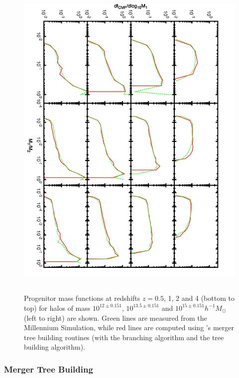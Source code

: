 \begin{figure}
 \begin{center}
 \includegraphics[height=160mm,angle=90]{../plots/progenitorMassFunction.pdf}
 \end{center}
 \caption{Progenitor mass functions at redshifts $z=0.5$, 1, 2 and 4 (bottom to top) for halos of mass $10^{12\pm0.151}$, $10^{13.5\pm0.151}$ and $10^{15\pm0.151}h^{-1}M_\odot$ (left to right) are shown. Green lines are measured from the Millennium Simulation, while red lines are computed using \glc's merger tree building routines (with the \cite{parkinson_generating_2008} branching algorithm and the \cite{cole_hierarchical_2000} tree building algorithm).}
 \label{fig:PCH_Progenitor_MFs}
\end{figure}

\subsubsection{Merger Tree Building}\label{sec:MergerTreeBuildMethod}

